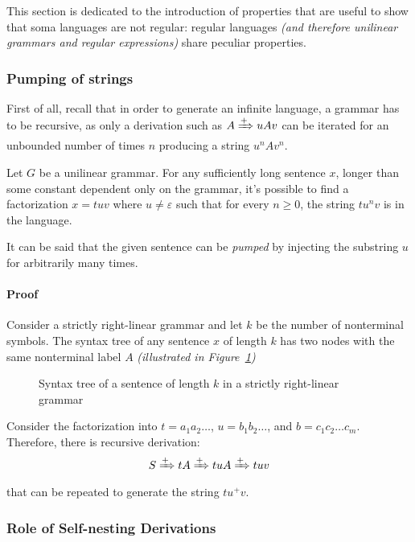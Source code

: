 \documentclass[english]{article}
\begin{document}
This section is dedicated to the introduction of properties that are useful to show that soma languages are not regular:
regular languages \textit{(and therefore unilinear grammars and regular expressions)} share peculiar properties.

\subsubsection{Pumping of strings}

First of all, recall that in order to generate an infinite language, a grammar has to be recursive, as only a derivation such as \(A \xRightarrow{+} u A v\) can be iterated for an unbounded number of times \(n\) producing a string \(u^n A v^n\).

Let \(G\) be a unilinear grammar.
For any sufficiently long sentence \(x\), longer than some constant dependent only on the grammar, it's possible to find a factorization \(x = tuv\) where \(u \neq \varepsilon\) such that for every \(n \geq 0\), the string \(t u^n v\) is in the language.

It can be said that the given sentence can be \textit{pumped} by injecting the substring \(u\) for arbitrarily many times.

\paragraph{Proof}

Consider a strictly right-linear grammar and let \(k\) be the number of nonterminal symbols.
The syntax tree of any sentence \(x\) of length \(k\) has two nodes with the same nonterminal label \(A\) \textit{(illustrated in Figure~\ref{fig:pumping-strings-syntax-tree})}

\begin{figure}[htbp]
  \centering
  \bigskip
  \caption{Syntax tree of a sentence of length \(k\) in a strictly right-linear grammar}
  \label{fig:pumping-strings-syntax-tree}
  \bigskip
\end{figure}

Consider the factorization into \(t = a_1 a_2 \ldots\), \(u = b_1 b_2 \ldots\), and \(b = c_1 c_2 \ldots c_m\).
Therefore, there is recursive derivation:
\[S \xRightarrow{+} t A \xRightarrow{+} tuA \xRightarrow{+} tuv \]
that can be repeated to generate the string \(tu^+ v\).

\subsubsection{Role of Self-nesting Derivations}
\end{document}
